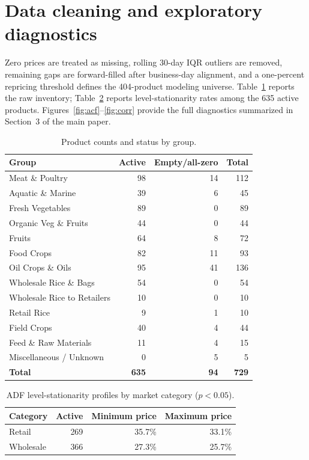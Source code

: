 \documentclass[11pt]{article}
\begin{document}
\section{Data cleaning and exploratory diagnostics}
Zero prices are treated as missing, rolling 30-day IQR outliers are removed, remaining gaps are forward-filled after business-day alignment, and a one-percent repricing threshold defines the 404-product modeling universe. Table~\ref{tab:inventory} reports the raw inventory; Table~\ref{tab:stationarity} reports level-stationarity rates among the 635 active products. Figures~\ref{fig:acf}--\ref{fig:corr} provide the full diagnostics summarized in Section~3 of the main paper.

\begin{table}[htbp]\centering
\caption{Product counts and status by group.}\label{tab:inventory}\small
\begin{tabular}{lrrr}\toprule
Group & Active & Empty/all-zero & Total \\
\midrule
Meat \& Poultry & 98 & 14 & 112 \\
Aquatic \& Marine & 39 & 6 & 45 \\
Fresh Vegetables & 89 & 0 & 89 \\
Organic Veg \& Fruits & 44 & 0 & 44 \\
Fruits & 64 & 8 & 72 \\
Food Crops & 82 & 11 & 93 \\
Oil Crops \& Oils & 95 & 41 & 136 \\
Wholesale Rice \& Bags & 54 & 0 & 54 \\
Wholesale Rice to Retailers & 10 & 0 & 10 \\
Retail Rice & 9 & 1 & 10 \\
Field Crops & 40 & 4 & 44 \\
Feed \& Raw Materials & 11 & 4 & 15 \\
Miscellaneous / Unknown & 0 & 5 & 5 \\
\textbf{Total} & \textbf{635} & \textbf{94} & \textbf{729} \\
\bottomrule\end{tabular}\end{table}

\begin{table}[htbp]\centering
\caption{ADF level-stationarity profiles by market category ($p<0.05$).}\label{tab:stationarity}\small
\begin{tabular}{lrrr}\toprule
Category & Active & Minimum price & Maximum price \\
\midrule
Retail & 269 & 35.7\% & 33.1\% \\
Wholesale & 366 & 27.3\% & 25.7\% \\
\bottomrule\end{tabular}\end{table}
\end{document}
